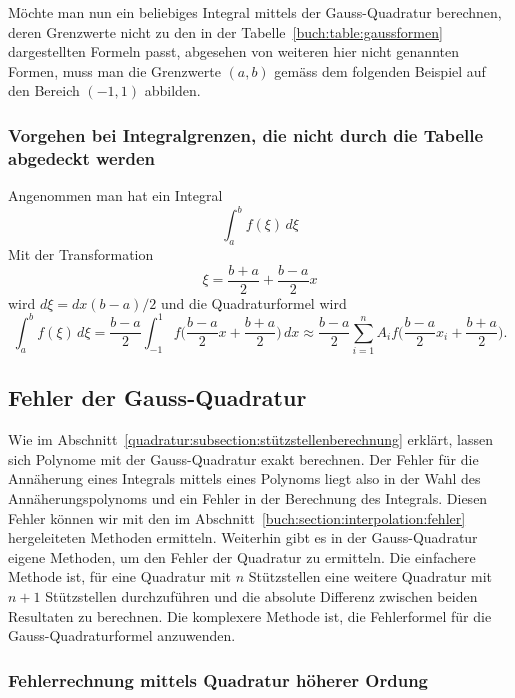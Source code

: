 Möchte man nun ein beliebiges Integral mittels der Gauss-Quadratur berechnen,
deren Grenzwerte nicht zu den in der Tabelle~\ref{buch:table:gaussformen} 
dargestellten Formeln passt, 
abgesehen von weiteren hier nicht genannten Formen, 
muss man die Grenzwerte $(a, b)$ gemäss dem folgenden Beispiel
auf den Bereich $(-1, 1)$ abbilden.

\subsubsection{Vorgehen bei Integralgrenzen, die nicht durch die Tabelle abgedeckt werden}

Angenommen man hat ein Integral
\begin{equation}
    \int_{a}^{b}f(\xi)\,d\xi
\end{equation}
Mit der Transformation
\begin{equation}
    \xi = \frac{b + a}{2} + \frac{b - a}{2} x    
\end{equation}
wird $d\xi = dx(b - a)/2$ und die Quadraturformel wird
\begin{equation}
    \int_{a}^{b}f(\xi)\,d\xi 
    =
    \frac{b - a}{2} \int_{-1}^{1}f\bigg(\frac{b - a}{2}x + \frac{b + a}{2}\bigg)\, dx 
    \approx
     \frac{b - a}{2} \sum_{i=1}^{n} A_{i}f\bigg(\frac{b - a}{2}x_{i} + \frac{b + a}{2}\bigg).
\end{equation}

\subsection{Fehler der Gauss-Quadratur
\label{quadratur:subsection:gaussfehler}}
Wie im Abschnitt~\ref{quadratur:subsection:stützstellenberechnung} erklärt,
lassen sich Polynome mit der Gauss-Quadratur exakt berechnen. 
Der Fehler für die Annäherung eines Integrals mittels eines Polynoms liegt
also in der Wahl des Annäherungspolynoms und ein Fehler in der Berechnung des Integrals.
Diesen Fehler können wir mit den im Abschnitt~\ref{buch:section:interpolation:fehler}
hergeleiteten Methoden ermitteln.
Weiterhin gibt es in der Gauss-Quadratur eigene Methoden, 
um den Fehler der Quadratur zu ermitteln. 
Die einfachere Methode ist, für eine Quadratur mit $n$ Stützstellen eine weitere
Quadratur mit $n+1$ Stützstellen durchzuführen und die absolute Differenz
zwischen beiden Resultaten zu berechnen. 
Die komplexere Methode ist, 
die Fehlerformel für die Gauss-Quadraturformel anzuwenden. 

\subsubsection{Fehlerrechnung mittels Quadratur höherer Ordung}


